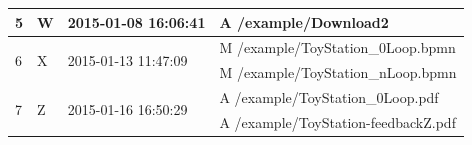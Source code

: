 \begin{table}[bt]
{\begin{tabular}{m{.8cm} m{1.5cm} m{3cm} p{5.8cm}}
5 & W & 2015-01-08 16:06:41 & A /example/Download2\\ \hline %

\multirow{2}{*}{6} & \multirow{2}{*}{X} & \multirow{2}{*}{2015-01-13 11:47:09} & M /example/ToyStation\_0Loop.bpmn\\
& & & M /example/ToyStation\_nLoop.bpmn \\ \hline %

\multirow{2}{*}{7} & \multirow{2}{*}{Z} & \multirow{2}{*}{2015-01-16 16:50:29} & A /example/ToyStation\_0Loop.pdf\\
& & & A /example/ToyStation-feedbackZ.pdf\\ \hline %
\end{tabular}\\ \hfill
}
\end{table}



